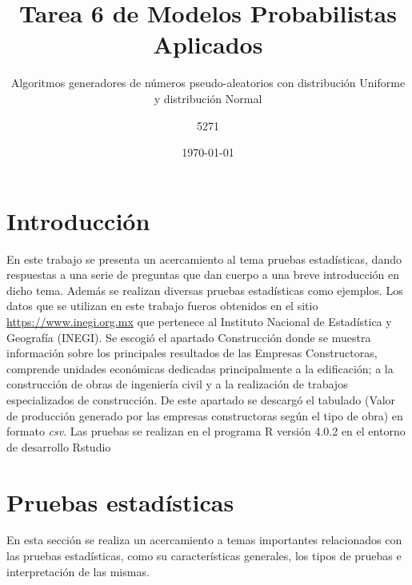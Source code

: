 \documentclass{article}
\title{Tarea 6 de Modelos Probabilistas Aplicados}
\subtitle{Algoritmos generadores de números pseudo-aleatorios con distribución Uniforme y distribución Normal}
\author{5271}
\date{\today}
\begin{document}
\maketitle

\section{Introducción}

En este trabajo se presenta un acercamiento al tema pruebas estadísticas, dando respuestas a una serie de preguntas que dan cuerpo a una breve introducción en dicho tema. Además se realizan diversas pruebas estadísticas como ejemplos. Los datos que se utilizan en este trabajo fueros obtenidos en el sitio \href{https://www.inegi.org.mx/default.html}{https://www.inegi.org.mx} que pertenece al Instituto Nacional de Estadística y Geografía (INEGI). Se escogió el apartado Construcción donde se muestra información sobre los principales resultados de las Empresas Constructoras, comprende unidades económicas dedicadas principalmente a la edificación; a la construcción de obras de ingeniería civil y a la realización de trabajos especializados de construcción. De este apartado se descargó el tabulado (Valor de producción generado por las empresas constructoras según el tipo de obra) en formato \textit{csv}. Las pruebas se  realizan en el programa R versión 4.0.2 \cite{r} en el entorno de desarrollo Rstudio \cite{rstudio}

\section{Pruebas estadísticas}
En esta sección se realiza un acercamiento a temas importantes relacionados con las pruebas estadísticas, como su características generales, los tipos de pruebas e interpretación de las mismas. 
\end{document}
